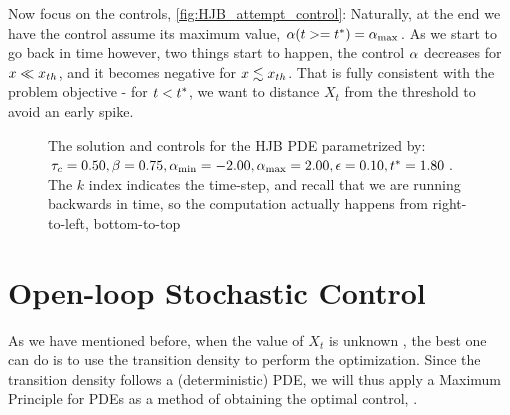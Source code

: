 \documentclass{article}
\begin{document}
Now focus on the controls, \cref{fig:HJB_attempt_control}: Naturally, at the
end we have the control assume its maximum value, ${\alpha}(t>={ t^* }) = { {\alpha}_{\textrm{max}} }$. As we
start to go back in time however, two things start to happen, the control ${\alpha}$
decreases for $x \ll { x_{th} }$, and it becomes negative for $x \lesssim { x_{th} }$. 
That is fully consistent with the problem objective - for
$t<{ t^* }$, we want to distance $X_t$ from the threshold to avoid an early spike.
\begin{figure}[h!]
\begin{center}
\caption[]{The solution and controls for the HJB PDE parametrized by:
${ \tau_{c} } = 0.50,  \beta = 0.75,
{ {\alpha}_{\textrm{min}} } = -2.00, { {\alpha}_{\textrm{max}} } = 2.00, {\epsilon}=0.10,
{ t^* } = 1.80$. The $k$ index indicates the time-step, and recall that we are
running backwards in time, so the computation actually happens from right-to-left, bottom-to-top}
\label{fig:HJB_attempt}
\end{center}
\end{figure}

\section{Open-loop Stochastic Control}
As we have mentioned before, when the value of $X_t$ is unknown , the best one
can do is to use the transition density to perform the optimization. Since the
transition density follows a (deterministic) PDE, we will thus apply a Maximum
Principle for PDEs as a method of obtaining the optimal
control, \cite{Ahmed1981,Borzi2012}.
\end{document}
